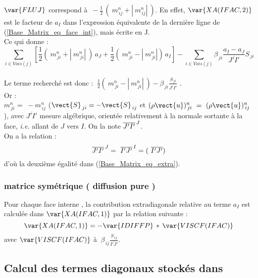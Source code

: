$\var{FLUJ}$ correspond \`a $\ -\displaystyle\frac{1}{2}\,(\ m_{\,ij}^n + |\
m_{\,ij}^n|\ )$. En effet, $\var{XA(IFAC,2)}$ est le facteur de $a_I$ dans l'expression \'equivalente de
la derni\`ere ligne de (\ref{Base_Matrix_eq_face_int}), mais \'ecrite en J.\\
Ce qui donne :\\
\begin{equation}\label{Base_Matrix_eq_extra_J}
\sum\limits_{i\in
Vois(j)}\left[\displaystyle\frac{1}{2}(\ m_{\,ji}^n + |\ m_{\,ji}^n|\ )\,a_J +
\displaystyle\frac{1}{2}(\ m_{\,ji}^n - |\ m_{\,ji}^n|)\,a_I\right]
 - \sum\limits_{i\in Vois(j)}\displaystyle \beta_{\,ji}\frac{a_I - a_J}{\overline{J'I'}} S_{\,ji}
\end{equation}\\
Le terme recherch\'e est donc :
$\ \displaystyle\frac{1}{2}(\ m_{\,ji}^n - |\ m_{\,ji}^n|\ )-\displaystyle
\beta_{\,ji}\frac {S_{\,ji}}{\overline{J'I'}}$ .\\
Or :\\ $ m_{\,ji}^n $ = $\ - m_{\,ij}^n $  ($\vect{S}_{\,ji} = -
\vect{S}_{\,ij}$ et $(\rho \vect{u})_{\,ji}^n\  =\ (\rho \vect{u})_{\,ij}^n\
$), avec $\overline{J'I'}$ mesure alg\'ebrique, orient\'ee relativement \`a la
normale sortante \`a la face, {\it i.e.} allant de $J$ vers $I$. On la note
${\overline{J'I'}^{\tiny {\,J}}}$. \\
On a la relation :\\
\begin{equation}\label{Base_Matrix_Eq_mesure_alg}
\overline{J'I'}^{\tiny {\,J}}=\ \overline{I'J'}^{\tiny {\,I}} = (\ \overline{I'J'})
\end{equation}
d'o\`u la deuxi\`eme \'egalit\'e dans (\ref{Base_Matrix_eq_extra}).
\subsubsection*{matrice sym\'etrique ( diffusion pure ) }
Pour chaque face interne \var{IFAC}, la contribution extradiagonale relative au
terme $a_I$ est calcul\'ee dans
$\var{XA(IFAC,1)}$ par la  relation suivante :\\
\begin{equation}
\var{XA(IFAC,1)} =  - \var{IDIFFP}\,*\,\var{VISCF(IFAC)}\\
\end{equation}
avec $\var{VISCF(IFAC)} $ \`a $ \ \displaystyle \beta_{\,ij}\frac {
S_{\,ij}}{\overline{I'J'}} $.
\subsection*{\bf Calcul des termes diagonaux stock\'es dans \var{DA} }
